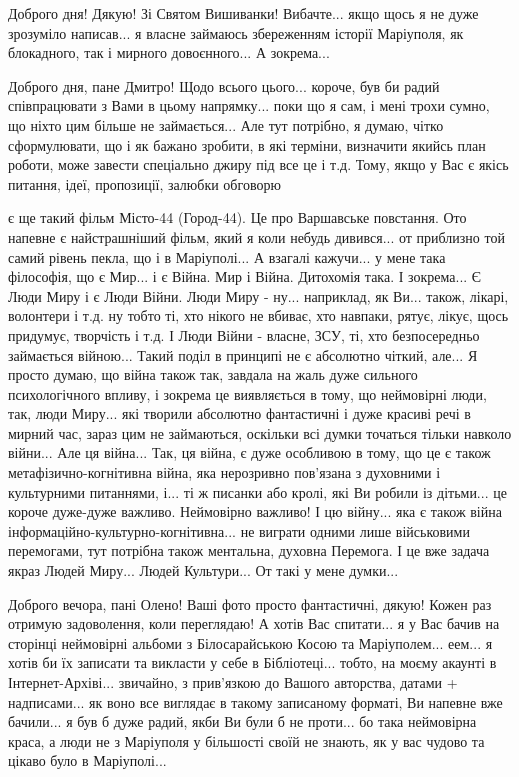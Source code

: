 Доброго дня! Дякую! Зі Святом Вишиванки! Вибачте... якщо щось я не дуже
зрозуміло написав... я власне займаюсь збереженням історії Маріуполя, як
блокадного, так і мирного довоєнного... А зокрема... 


Доброго дня, пане Дмитро! Щодо всього цього... короче, був би радий
співпрацювати з Вами в цьому напрямку... поки що я сам, і мені трохи сумно, що
ніхто цим більше не займається... Але тут потрібно, я думаю, чітко
сформулювати, що і як бажано зробити, в які терміни, визначити якийсь план роботи, може завести
спеціально джиру під все це і т.д. Тому, якщо у Вас є якісь питання, ідеї,
пропозиції, залюбки обговорю

є ще такий фільм Місто-44 (Город-44). Це про Варшавське повстання. Ото напевне
є найстрашніший фільм, який я коли небудь дивився... от приблизно той самий
рівень пекла, що і в Маріуполі... А взагалі кажучи... у мене така філософія, що
є Мир... і є Війна. Мир і Війна. Дитохомія така. І зокрема... Є Люди Миру і є
Люди Війни. Люди Миру - ну... наприклад, як Ви... також, лікарі, волонтери і
т.д. ну тобто ті, хто нікого не вбиває, хто навпаки, рятує, лікує, щось
придумує, творчість і т.д. І Люди Війни - власне, ЗСУ, ті, хто безпосередньо
займається війною... Такий поділ в принципі не є абсолютно чіткий, але... Я
просто думаю, що війна також так, завдала на жаль дуже сильного психологічного
впливу, і зокрема це виявляється в тому, що неймовірні люди, так, люди Миру...
які творили абсолютно фантастичні і дуже красиві речі в мирний час, зараз цим
не займаються, оскільки всі думки точаться тільки навколо війни... Але ця
війна... Так, ця війна, є дуже особливою в тому, що це є також
метафізично-когнітивна війна, яка нерозривно пов'язана з духовними і
культурними питаннями, і... ті ж писанки або кролі, які Ви робили із дітьми...
це короче дуже-дуже важливо. Неймовірно важливо! І цю війну... яка є також
війна інформаційно-культурно-когнітивна... не виграти одними лише військовими
перемогами, тут потрібна також ментальна, духовна Перемога. І це вже задача
якраз Людей Миру... Людей Культури... От такі у мене думки...

Доброго вечора, пані Олено! Ваші фото просто фантастичні, дякую! Кожен раз
отримую задоволення, коли переглядаю! А хотів Вас спитати... я у Вас бачив на
сторінці неймовірні альбоми з Білосарайською Косою та Маріуполем... еем... я
хотів би їх записати та викласти у себе в Бібліотеці... тобто, на моєму акаунті
в Інтернет-Архіві... звичайно, з прив'язкою до Вашого авторства, датами +
надписами... як воно все виглядає в такому записаному форматі, Ви напевне вже
бачили... я був б дуже радий, якби Ви були б не проти... бо така неймовірна
краса, а люди не з Маріуполя у більшості своїй не знають, як у вас чудово та
цікаво було в Маріуполі... 

